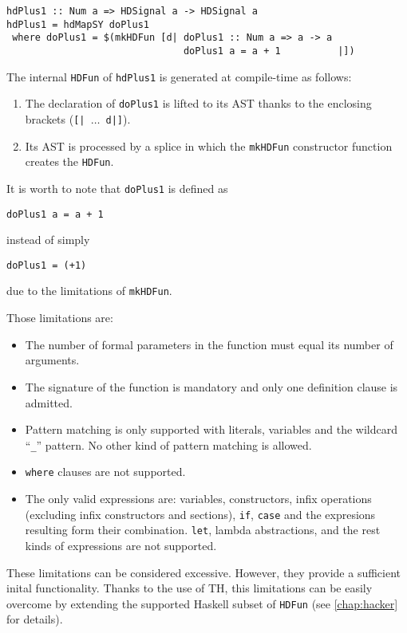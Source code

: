 \begin{lstlisting}
hdPlus1 :: Num a => HDSignal a -> HDSignal a 
hdPlus1 = hdMapSY doPlus1
 where doPlus1 = $(mkHDFun [d| doPlus1 :: Num a => a -> a
                               doPlus1 a = a + 1          |])
\end{lstlisting}

The internal \texttt{HDFun} of \texttt{hdPlus1} is generated at
compile-time as follows:

\begin{enumerate}[1)]
\item The declaration of \texttt{doPlus1} is lifted to its AST thanks to
  the  enclosing brackets (\texttt{[| $\dots$ d|]}).
\item Its AST is processed by a splice in which the \texttt{mkHDFun}
  constructor function creates the \texttt{HDFun}.
\end{enumerate}

It is worth to note that \texttt{doPlus1} is defined as 
\begin{lstlisting}
doPlus1 a = a + 1
\end{lstlisting}
instead of simply
\begin{lstlisting}
doPlus1 = (+1)
\end{lstlisting}
due to the limitations of \texttt{mkHDFun}. 

Those limitations are:

\begin{itemize}
 \item The number of formal parameters in the function must equal 
   its number of arguments.
 \item The signature of the function is mandatory and only one
   definition clause is admitted.
 \item Pattern matching is only supported with literals, variables and
   the wildcard ``\texttt{\_}'' pattern. No other kind of pattern matching
   is allowed. 
 \item \texttt{where} clauses are not supported.
 \item The only valid expressions are: variables, constructors, infix
   operations (excluding infix constructors and sections),
   \texttt{if}, \texttt{case} and the expresions resulting form
   their combination.  \texttt{let}, lambda abstractions, and the rest
   kinds of expressions are not supported.
\end{itemize}

These limitations can be considered excessive. However, they provide a
sufficient inital functionality. Thanks to the use of TH, this
limitations can be easily overcome by extending the supported Haskell
subset of \texttt{HDFun} (see \ref{chap:hacker} for details).

